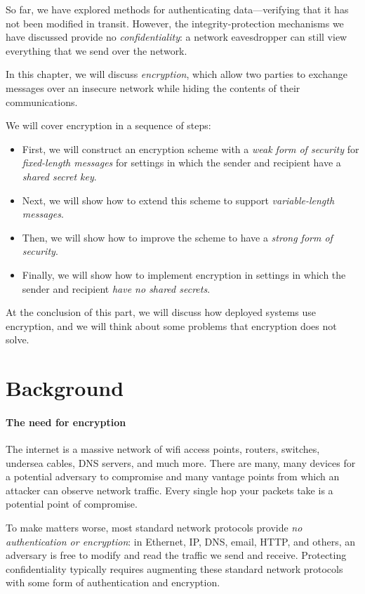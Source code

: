 So far, we have explored methods for authenticating data---verifying that it has not been modified in transit.
However, the integrity-protection mechanisms we
have discussed provide no \emph{confidentiality}:
a network eavesdropper can still view everything that 
we send over the network.

In this chapter, we will discuss \emph{encryption},
which allow two parties to exchange messages over an insecure
network while hiding the contents of their communications.


We will cover encryption in a sequence of steps:
\begin{itemize}
  \item First, we will construct an encryption scheme with a \emph{weak form of security} for \emph{fixed-length messages} for settings in which the sender and recipient have a \emph{shared secret key}.
  \item Next, we will show how to extend this scheme to support \emph{variable-length messages}.
  \item Then, we will show how to improve the scheme to have a \emph{strong form of security}.
  \item Finally, we will show how to implement encryption in settings in which the sender and recipient \emph{have no shared secrets}.
\end{itemize}
At the conclusion of this part, we will discuss how deployed systems
use encryption, and 
we will think about some problems that encryption does not solve.

\section{Background}

\paragraph{The need for encryption}
The internet is a massive network of wifi access
points, routers, switches, undersea cables, DNS
servers, and much more.
There are many, many
devices for a potential adversary to compromise
and many vantage points from which an attacker can 
observe network traffic. Every single hop your
packets take is a potential point of compromise.

To make matters worse, most standard network protocols provide \emph{no authentication or encryption}: in Ethernet, IP, DNS, 
email, HTTP, and others, an adversary is free to modify and read the traffic we send and receive. 
Protecting confidentiality typically requires augmenting these standard network
protocols with some form of authentication and encryption.

